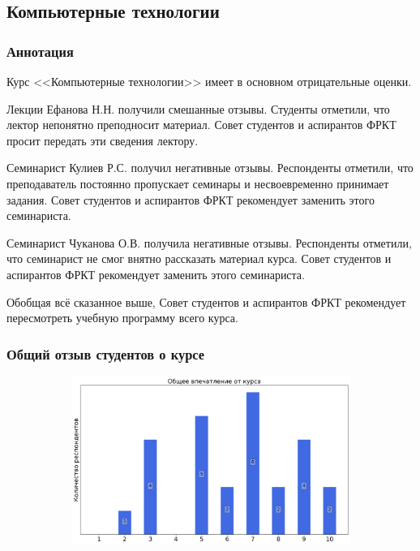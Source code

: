 \subsection{Компьютерные технологии}
	
	\subsubsection{Аннотация}

        Курс <<Компьютерные технологии>> имеет в основном отрицательные оценки.

        Лекции Ефанова Н.Н. получили смешанные отзывы. Студенты отметили, что лектор непонятно преподносит материал. Совет студентов и аспирантов ФРКТ просит передать эти сведения лектору.

        Семинарист Кулиев Р.С. получил негативные отзывы. Респонденты отметили, что преподаватель постоянно пропускает семинары и несвоевременно принимает задания. Совет студентов и аспирантов ФРКТ рекомендует заменить этого семинариста.

        Семинарист Чуканова О.В. получила негативные отзывы. Респонденты отметили, что семинарист не смог внятно рассказать материал курса. Совет студентов и аспирантов ФРКТ рекомендует заменить этого семинариста.

        Обобщая всё сказанное выше, Совет студентов и аспирантов ФРКТ рекомендует пересмотреть учебную программу всего курса.


	\subsubsection{Общий отзыв студентов о курсе}

		\begin{figure}[H]
			\centering
			\begin{subfigure}[b]{0.45\textwidth}
				\centering
				\includegraphics[width=\textwidth]{images/2 course/Компьютерные технологии/general-0.png}
			\end{subfigure}
		\end{figure}

